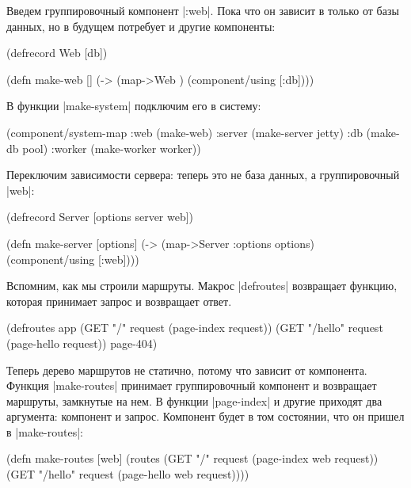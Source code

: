 Введем группировочный компонент \spverb|:web|. Пока что он зависит в только от
базы данных, но в будущем потребует и другие компоненты:

\begin{english}
  \begin{clojure}
(defrecord Web [db])

(defn make-web []
  (-> (map->Web {})
      (component/using [:db])))
  \end{clojure}
\end{english}

В функции \spverb|make-system| подключим его в систему:

\begin{english}
  \begin{clojure}
(component/system-map
 :web    (make-web)
 :server (make-server jetty)
 :db     (make-db pool)
 :worker (make-worker worker))
  \end{clojure}
\end{english}

Переключим зависимости сервера: теперь это не база данных, а группировочный
\spverb|web|:

\begin{english}
  \begin{clojure}
(defrecord Server
  [options server web])

(defn make-server
  [options]
  (-> (map->Server {:options options})
      (component/using [:web])))
  \end{clojure}
\end{english}

Вспомним, как мы строили маршруты. Макрос \spverb|defroutes| возвращает функцию,
которая принимает запрос и возвращает ответ.

\begin{english}
  \begin{clojure}
(defroutes app
  (GET "/"      request (page-index request))
  (GET "/hello" request (page-hello request))
  page-404)
  \end{clojure}
\end{english}

Теперь дерево маршрутов не статично, потому что зависит от компонента. Функция
\spverb|make-routes| принимает группировочный компонент и возвращает маршруты,
замкнутые на нем. В функции \spverb|page-index| и другие приходят два аргумента:
компонент и запрос. Компонент будет в том состоянии, что он пришел в
\spverb|make-routes|:

\begin{english}
  \begin{clojure}
(defn make-routes [web]
  (routes
   (GET "/"      request (page-index web request))
   (GET "/hello" request (page-hello web request))))
  \end{clojure}
\end{english}

